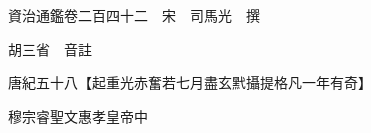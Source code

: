 










 


 
 


 

  
  
  
  
  





  
  
  
  
  
 
  

  

  
  
  



  

 
 

  
   




  

  
  


  　　資治通鑑卷二百四十二　宋　司馬光　撰

　　胡三省　音註

　　唐紀五十八【起重光赤奮若七月盡玄黓攝提格凡一年有奇】

　　穆宗睿聖文惠孝皇帝中

